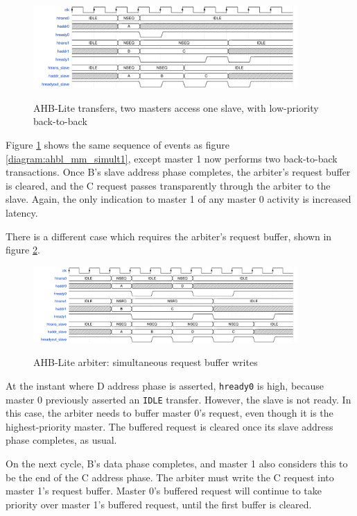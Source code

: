 \begin{figure}[H]
\centering
\caption{AHB-Lite transfers, two masters access one slave, with low-priority back-to-back}
\includegraphics[width=0.9\textwidth]{waves/ahbl_mm_simult2.pdf}
\label{diagram:ahbl_mm_simult2}
\end{figure}

Figure \ref{diagram:ahbl_mm_simult2} shows the same sequence of events as figure \ref{diagram:ahbl_mm_simult1}, except master 1 now performs two back-to-back transactions. Once B's slave address phase completes, the arbiter's request buffer is cleared, and the C request passes transparently through the arbiter to the slave. Again, the only indication to master 1 of any master 0 activity is increased latency.

There is a different case which requires the arbiter's request buffer, shown in figure \ref{diagram:ahbl_mm_simult3}.

\begin{figure}[H]
\centering
\caption{AHB-Lite arbiter: simultaneous request buffer writes}
\includegraphics[width=0.9\textwidth]{waves/ahbl_mm_simult3.pdf}
\label{diagram:ahbl_mm_simult3}
\end{figure}

At the instant where D address phase is asserted, {\tt hready0} is high, because master 0 previously asserted an {\tt IDLE} transfer. However, the slave is not ready. In this case, the arbiter needs to buffer master 0's request, even though it is the highest-priority master. The buffered request is cleared once its slave address phase completes, as usual.

On the next cycle, B's data phase completes, and master 1 also considers this to be the end of the C address phase. The arbiter must write the C request into master 1's request buffer. Master 0's buffered request will continue to take priority over master 1's buffered request, until the first buffer is cleared.

